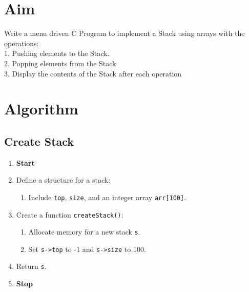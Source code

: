 
\section{Aim}
Write a menu driven C Program to implement a Stack using arrays with the operations:
\\1. Pushing elements to the Stack.
\\2. Popping elements from the Stack
\\3. Display the contents of the Stack after each operation


\section{Algorithm}
 {\selectfont

  \subsection{Create Stack}
  \begin{enumerate}[label=\arabic*:,left=0pt]
    \item \textbf{Start}

    \item Define a structure for a stack:
          \begin{enumerate}[label=2.\arabic*.]
            \item Include \texttt{top}, \texttt{size}, and an integer array \texttt{arr[100]}.
          \end{enumerate}

    \item Create a function \texttt{createStack()}:
          \begin{enumerate}[label=3.\arabic*.]
            \item Allocate memory for a new stack \texttt{s}.
            \item Set \texttt{s->top} to -1 and \texttt{s->size} to 100.
          \end{enumerate}
    \item Return \texttt{s}.
    \item \textbf{Stop}
  \end{enumerate}

}
